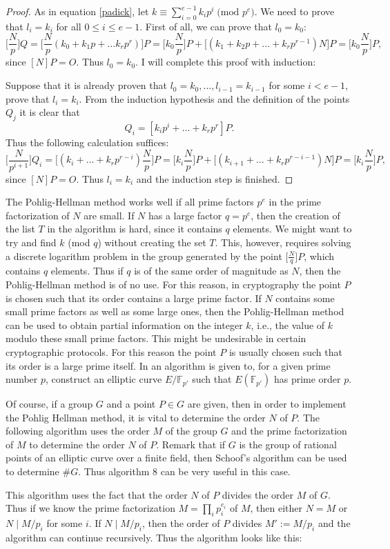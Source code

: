 \documentclass{article}
\numberwithin{equation}{section}
\theoremstyle{definition}
\newcommand{\FF}[1]{{\mathbb F}_{#1}} %
\begin{document}
\begin{proof}
As in equation \ref{padick}, let $k\equiv \sum_{i=0}^{e-1} k_ip^i \; \text{(mod } p^e)$. We need to prove that $l_i=k_i$ for all $0\leq i \leq e-1$. First of all, we can prove that $l_0=k_0$: $$ \big[\frac{N}{p}\big]Q=\big[\frac{N}{p}(k_0+k_1p+\ldots k_rp^r)\big] P  = \big[k_0\frac{N}{p}\big]P+\big[(k_1+k_2p+\ldots + k_rp^{r-1})N\big]P = \big[k_0\frac{N}{p}\big]P, $$ since $[N]P=O$. Thus $l_0=k_0$. I will complete this proof with induction:\par
Suppose that it is already proven that $l_0=k_0,\ldots,l_{i-1}=k_{i-1}$ for some $i <e-1$, prove that $l_i=k_i$. From the induction hypothesis and the definition of the points $Q_j$ it is clear that $$Q_i=[k_ip^i+ \ldots + k_rp^r]P.$$ Thus the following calculation suffices: $$\big[\frac{N}{p^{i+1}}\big] Q_i = \big[(k_i+ \ldots + k_r p^{r-i})\frac{N}{p}\big]P = \big[k_i \frac{N}{p}\big]P + \big[(k_{i+1} + \ldots + k_rp^{r-i-1}) N\big] P = \big[k_i \frac{N}{p}\big]P,$$ since $[N]P=O$. Thus $l_i=k_i$ and the induction step is finished.
\end{proof}

The Pohlig-Hellman method works well if all prime factors $p^e$ in the prime factorization of $N$ are small. If $N$ has a large factor $q=p^e$, then the creation of the list $T$ in the algorithm is hard, since it contains $q$ elements. We might want to try and find $k$ (mod $q$) without creating the set $T$. This, however, requires solving a discrete logarithm problem in the group generated by the point $\big[\frac{N}{q}\big]P$, which contains $q$ elements. Thus if $q$ is of the same order of magnitude as $N$, then the Pohlig-Hellman method is of no use. For this reason, in cryptography the point $P$ is chosen such that its order contains a large prime factor. If $N$ contains some small prime factors as well as some large ones, then the Pohlig-Hellman method can be used to obtain partial information on the integer $k$, i.e., the value of $k$ modulo these small prime factors. This might be undesirable in certain cryptographic protocols. For this reason the point $P$ is usually chosen such that its order is a large prime itself. In \cite{constrprimeordEC} an algorithm is given to, for a given prime number $p$, construct an elliptic curve $E/\FF{p'}$ such that $E(\FF{p'})$ has prime order $p$.\par 
Of course, if a group $G$ and a point $P \in G$ are given, then in order to implement the Pohlig Hellman method, it is vital to determine the order $N$ of $P$. The following algorithm uses the order $M$ of the group $G$ and the prime factorization of $M$ to determine the order $N$ of $P$. Remark that if $G$ is the group of rational points of an elliptic curve over a finite field, then Schoof's algorithm can be used to determine $\#G$. Thus algorithm $8$ can be very useful in this case.\par 
This algorithm uses the fact that the order $N$ of $P$ divides the order $M$ of $G$. Thus if we know the prime factorization $M=\prod_i p_i^{e_i}$ of $M$, then either $N=M$ or $N \mid M/p_i$ for some $i$. If $N \mid M/p_i$, then the order of $P$ divides $M':=M/p_i$ and the algorithm can continue recursively. Thus the algorithm looks like this:
\end{document}
